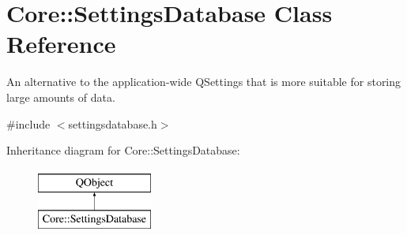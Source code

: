 \hypertarget{class_core_1_1_settings_database}{\section{Core\-:\-:Settings\-Database Class Reference}
\label{class_core_1_1_settings_database}
}


An alternative to the application-\/wide Q\-Settings that is more suitable for storing large amounts of data.  




{\ttfamily \#include $<$settingsdatabase.\-h$>$}

Inheritance diagram for Core\-:\-:Settings\-Database\-:\begin{figure}[H]
\begin{center}
\leavevmode
\includegraphics[height=2.000000cm]{class_core_1_1_settings_database}
\end{center}
\end{figure}
